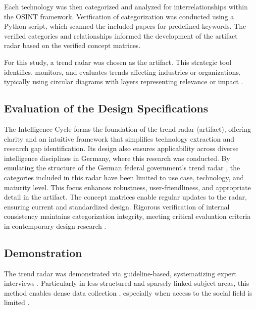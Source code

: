 \documentclass[10pt]{article}
\begin{document}

Each technology was then categorized and analyzed for interrelationships within the OSINT framework. Verification of categorization was conducted using a Python script, which scanned the included papers for predefined keywords. The verified categories and relationships informed the development of the artifact radar based on the verified concept matrices.

For this study, a trend radar was chosen as the artifact. This strategic tool identifies, monitors, and evaluates trends affecting industries or organizations, typically using circular diagrams with layers representing relevance or impact \cite{wulfmettbrenn2017}.

\subsection{Evaluation of the Design Specifications}
The Intelligence Cycle forms the foundation of the trend radar (artifact), offering clarity and an intuitive framework that simplifies technology extraction and research gap identification. Its design also ensures applicability across diverse intelligence disciplines in Germany, where this research was conducted. By emulating the structure of the German federal government's trend radar \cite{Stich.2022}, the categories included in this radar have been limited to use case, technology, and maturity level. This focus enhances robustness, user-friendliness, and appropriate detail in the artifact. The concept matrices enable regular updates to the radar, ensuring current and standardized design. Rigorous verification of internal consistency maintains categorization integrity, meeting critical evaluation criteria in contemporary design research \cite{vomBrocke.2020b}.


\subsection{Demonstration}
The trend radar was demonstrated via guideline-based, systematizing expert interviews \cite{Bogner.2014, Glaser.2009, Meuser.1991}. Particularly in less structured and sparsely linked subject areas, this method enables dense data collection \cite{Bogner.2014, Meuser.1991}, especially when access to the social field is limited \cite{Bogner.2002c, Glaser.2009}.
\end{document}
